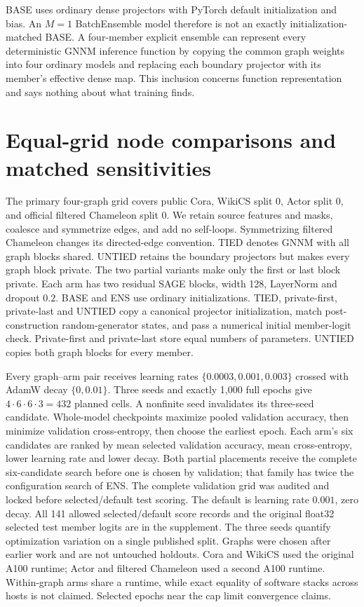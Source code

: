 BASE uses ordinary dense projectors with PyTorch default initialization
and bias. An $M=1$ BatchEnsemble model therefore is not an exactly
initialization-matched BASE. A four-member explicit ensemble can represent
every deterministic GNNM inference function by copying the common graph
weights into four ordinary models and replacing each boundary projector
with its member's effective dense map. This inclusion concerns function
representation and says nothing about what training finds.

\section{Equal-grid node comparisons and matched sensitivities}\label{app:validation-tuning}
The primary four-graph grid covers public Cora, WikiCS split 0, Actor
split 0, and official filtered Chameleon split 0. We retain source
features and masks, coalesce and symmetrize edges, and add no self-loops.
Symmetrizing filtered Chameleon changes its directed-edge convention.
TIED denotes GNNM with all graph blocks shared. UNTIED retains the
boundary projectors but makes every graph block private. The two partial
variants make only the first or last block private. Each arm has two
residual SAGE blocks, width 128, LayerNorm and dropout
$0.2$. BASE and ENS use ordinary initializations. TIED, private-first,
private-last and UNTIED copy a canonical projector initialization, match
post-construction random-generator states, and pass a numerical initial
member-logit check. Private-first and private-last store equal numbers
of parameters. UNTIED copies both graph blocks for every member.

Every graph--arm pair receives learning rates
$\{0.0003,0.001,0.003\}$ crossed with AdamW decay $\{0,0.01\}$.
Three seeds and exactly 1,000 full epochs give $4\cdot6\cdot6\cdot3=432$
planned cells. A nonfinite seed invalidates its three-seed candidate.
Whole-model checkpoints maximize pooled validation accuracy, then
minimize validation cross-entropy, then choose the earliest epoch. Each
arm's six candidates are ranked by mean selected validation accuracy,
mean cross-entropy, lower learning rate and lower decay. Both partial
placements receive the complete six-candidate search before one is
chosen by validation; that family has twice the configuration search
of ENS. The complete validation grid was audited and locked before
selected/default test scoring. The default is learning rate $0.001$,
zero decay. All 141 allowed selected/default score records and the
original float32 selected test member logits are in the supplement.
The three seeds quantify optimization variation on a single published
split. Graphs were chosen after earlier work and are not untouched
holdouts. Cora and WikiCS used the original A100 runtime; Actor and
filtered Chameleon used a second A100 runtime. Within-graph arms share
a runtime, while exact equality of software stacks across hosts is not
claimed. Selected epochs near the cap limit convergence claims.

